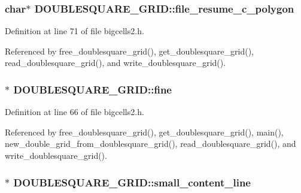 \hypertarget{struct_d_o_u_b_l_e_s_q_u_a_r_e___g_r_i_d_a5b8e6e5a9c93dcf6a98b48a6db24bb7e}{
\subsubsection[{file\-\_\-resume\-\_\-c\-\_\-polygon}]{\setlength{\rightskip}{0pt plus 5cm}char$\ast$ D\-O\-U\-B\-L\-E\-S\-Q\-U\-A\-R\-E\-\_\-\-G\-R\-I\-D\-::file\-\_\-resume\-\_\-c\-\_\-polygon}}\label{struct_d_o_u_b_l_e_s_q_u_a_r_e___g_r_i_d_a5b8e6e5a9c93dcf6a98b48a6db24bb7e}


Definition at line 71 of file bigcells2.\-h.



Referenced by free\-\_\-doublesquare\-\_\-grid(), get\-\_\-doublesquare\-\_\-grid(), read\-\_\-doublesquare\-\_\-grid(), and write\-\_\-doublesquare\-\_\-grid().

\hypertarget{struct_d_o_u_b_l_e_s_q_u_a_r_e___g_r_i_d_a4ad68ee9c6dda1e32b357dc1be36953c}{
\subsubsection[{fine}]{$\ast$ D\-O\-U\-B\-L\-E\-S\-Q\-U\-A\-R\-E\-\_\-\-G\-R\-I\-D\-::fine}}\label{struct_d_o_u_b_l_e_s_q_u_a_r_e___g_r_i_d_a4ad68ee9c6dda1e32b357dc1be36953c}


Definition at line 66 of file bigcells2.\-h.



Referenced by free\-\_\-doublesquare\-\_\-grid(), get\-\_\-doublesquare\-\_\-grid(), main(), new\-\_\-double\-\_\-grid\-\_\-from\-\_\-doublesquare\-\_\-grid(), read\-\_\-doublesquare\-\_\-grid(), and write\-\_\-doublesquare\-\_\-grid().

\hypertarget{struct_d_o_u_b_l_e_s_q_u_a_r_e___g_r_i_d_a5d612d3850c4ce4f7327491024e0df6c}{
\subsubsection[{small\-\_\-content\-\_\-line}]{$\ast$ D\-O\-U\-B\-L\-E\-S\-Q\-U\-A\-R\-E\-\_\-\-G\-R\-I\-D\-::small\-\_\-content\-\_\-line}}\label{struct_d_o_u_b_l_e_s_q_u_a_r_e___g_r_i_d_a5d612d3850c4ce4f7327491024e0df6c}



